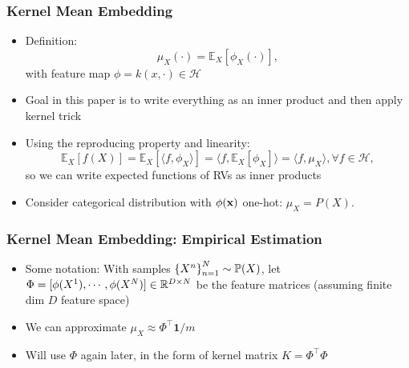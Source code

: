 \documentclass{beamer}
\begin{document}
\begin{frame}
\frametitle{Kernel Mean Embedding}
\begin{itemize}
\item Definition: 
$$\mu_X(\cdot) = \mathbb{E}_X[\phi_X(\cdot)],$$
with feature map $\phi = k(x, \cdot) \in \mathscr{H}$
\vspace{1em}
\item Goal in this paper is to write everything as an inner product and then apply
kernel trick
\vspace{1em}
\item Using the reproducing property and linearity:
$$\mathbb{E}_X[f(X)]
= \mathbb{E}_X[\langle f, \phi_X \rangle]
= \langle f, \mathbb{E}_X[\phi_X] \rangle
= \langle f, \mu_X\rangle, \forall f \in \mathscr{H},$$
so we can write expected functions of RVs as inner products
\vspace{1em}
\item Consider categorical distribution with $\phi(\mathbf{x})$ one-hot:
    $\mu_X = P(X)$.
\end{itemize}
\end{frame}

\begin{frame}
\frametitle{Kernel Mean Embedding: Empirical Estimation}
\begin{itemize}
\item Some notation: With samples $\left\{X^n\right\}_{n=1}^N\sim \mathbb{P}(X)$,
let $\Phi= [\phi(X^1), \cdots, \phi(X^N)] \in \mathbb{R}^{D\times N}$ be the feature matrices
(assuming finite dim $D$ feature space)
\vspace{2em}
\item We can approximate $\mu_X \approx \Phi^\top\mathbf{1} / m$
\vspace{2em}
\item Will use $\Phi$ again later, in the form of kernel matrix
    $K = \Phi^\top\Phi$
\end{itemize}
\end{frame}
\end{document}
